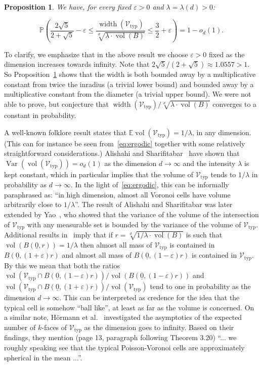 \documentclass[11pt]{article}%
\newtheorem{proposition} [theorem] {Proposition}%
\newcommand{\Vcal}[0]{\ensuremath{{\mathcal V}}}
\newcommand{\Pee}[0]{\ensuremath{{\mathbb P}}}
\newcommand{\Ee}[0]{\ensuremath{{\mathbb E}}}
\newcommand{\eps}{\varepsilon}
\newcommand{\orig}{\underline{0}}
\DeclareMathOperator{\vol}{vol}
\DeclareMathOperator{\Var}{Var}
\DeclareMathOperator{\width}{width}
\newcommand{\Vtyp}[0]{\Vcal_{\text{typ}}}
\begin{document}
\begin{proposition}\label{prop:width}
We have, for every fixed $\eps>0$ and $\lambda = \lambda(d) > 0$:

$$ \Pee\left( \frac{2\sqrt{5}}{2+\sqrt{5}}-\eps \leq \frac{\width(\Vtyp)}{\sqrt[d]{\lambda\cdot\vol(B)}} 
\leq \frac{3}{2}+\eps \right) = 1 - o_d(1). $$

\end{proposition}

To clarify, we emphasize that in the above result we choose $\eps>0$ fixed as the dimension 
increases towards infinity.
Note that $2\sqrt{5}/(2+\sqrt{5})\approx 1.0557 > 1$. So Proposition~\ref{prop:width} 
shows that the width is both bounded away by a multiplicative constant from twice the inradius (a trivial lower bound) 
and bounded away by a multiplicative constant from the diameter (a trivial upper bound).
We were not able to prove, but conjecture that $\width(\Vtyp)/\sqrt[d]{\lambda \cdot \vol(B)}$ converges to a constant
in probability.

\vspace{1ex}

A well-known folklore result states that $\Ee \vol(\Vtyp) = 1/\lambda$, in any dimension. (This can for instance be
seen from~\eqref{eq:ergodic} together with some relatively straightforward considerations.) 
Alishahi and Sharifitabar~\cite{AlishahiSharifitabar08} have shown that $\Var\left(\vol(\Vtyp)\right) = o_d(1)$ as 
the dimension $d\to\infty$ and the intensity $\lambda$ is kept constant, which 
in particular implies that the volume of $\Vtyp$ tends to $1/\lambda$ in probability as 
$d\to\infty$. In the light of~\eqref{eq:ergodic}, this can be informally paraphrased as: ``in high dimension, almost all
Voronoi cells have volume arbitrarily close to $1/\lambda$''.
The result of Alishahi and Sharifitabar was later extended by Yao~\cite{Yao}, who showed that the variance of the 
volume of the intersection of $\Vtyp$ with any measurable set is bounded by the variance of the volume of $\Vtyp$.
Additional results in~\cite{AlishahiSharifitabar08} imply that if $r = \sqrt[d]{1/\lambda \cdot \vol(B)}$ is such that 
$\vol(B(\orig,r)) = 1/\lambda$ then almost all mass of $\Vtyp$ is contained in $B(\orig,(1+\eps)r)$ and 
almost all mass of $B(\orig,(1-\eps)r)$ is contained in $\Vtyp$.
By this we mean that both the ratios $\vol(\Vtyp \cap B(\orig,(1-\eps) r)) / \vol(B(\orig,(1-\eps)r))$ and 
$\vol(\Vtyp \cap B(\orig,(1+\eps) r)) / \vol(\Vtyp)$ tend to one in probability as 
the dimension $d\to\infty$.
This can be interpreted as credence for the idea that the typical cell is somehow ``ball like'', at least as far as the 
volume is concerned.
On a similar note, H\"ormann et al.~\cite{HoermannEtal} investigated the asymptotics of the expected number of 
$k$-faces of $\Vtyp$ as the dimension goes to infinity.
Based on their findings, they mention (page 13, paragraph following Theorem 3.20) ``... we roughly speaking see that 
the typical Poisson-Voronoi cells are approximately spherical in the mean ...''.
\end{document}
